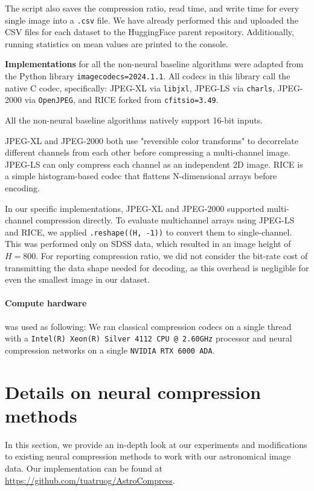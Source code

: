The script also saves the compression ratio, read time, and write time for every single image into a \texttt{.csv} file. We have already performed this and uploaded the CSV files for each dataset to the HuggingFace parent repository. Additionally, running statistics on mean values are printed to the console.

\textbf{Implementations} for all the non-neural baseline algorithms were adapted from the Python library \texttt{imagecodecs=2024.1.1}. All codecs in this library call the native C codec, specifically: JPEG-XL via \texttt{libjxl}, JPEG-LS via \texttt{charls}, JPEG-2000 via \texttt{OpenJPEG}, and RICE forked from \texttt{cfitsio=3.49}.

All the non-neural baseline algorithms natively support 16-bit inputs.

JPEG-XL and JPEG-2000 both use "reversible color transforms" to decorrelate different channels from each other before compressing a multi-channel image. JPEG-LS can only compress each channel as an independent 2D image. RICE is a simple histogram-based codec that flattens N-dimensional arrays before encoding.

In our specific implementations, JPEG-XL and JPEG-2000 supported multi-channel compression directly. To evaluate multichannel arrays using JPEG-LS and RICE, we applied \texttt{.reshape((H, -1))} to convert them to single-channel. This was performed only on SDSS data, which resulted in an image height of $H = 800$. For reporting compression ratio, we did not consider the bit-rate cost of transmitting the data shape needed for decoding, %
as this overhead is negligible for even the smallest image in our dataset.


\paragraph{Compute hardware} was used as following: We ran classical compression codecs on a single thread with a \texttt{Intel(R) Xeon(R) Silver 4112 CPU @ 2.60GHz} processor and neural compression networks on a single \texttt{NVIDIA RTX 6000 ADA}.


\section{Details on neural compression methods}\label{sec:protocol}
In this section, we provide an in-depth look at our experiments and modifications to existing neural compression methods to work with our astronomical image data. Our implementation can be found at \url{https://github.com/tuatruog/AstroCompress}.

